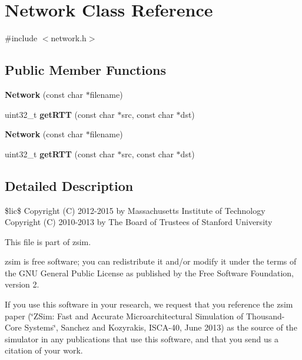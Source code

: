 \hypertarget{classNetwork}{\section{Network Class Reference}
\label{classNetwork}
}


{\ttfamily \#include $<$network.\-h$>$}

\subsection*{Public Member Functions}
\begin{DoxyCompactItemize}
\item 
\hypertarget{classNetwork_abe92fd675aabf57c14612fa7eed101cc}{{\bfseries Network} (const char $\ast$filename)}\label{classNetwork_abe92fd675aabf57c14612fa7eed101cc}

\item 
\hypertarget{classNetwork_ac23b99975b48e83f048c01f5ca90f763}{uint32\-\_\-t {\bfseries get\-R\-T\-T} (const char $\ast$src, const char $\ast$dst)}\label{classNetwork_ac23b99975b48e83f048c01f5ca90f763}

\item 
\hypertarget{classNetwork_abe92fd675aabf57c14612fa7eed101cc}{{\bfseries Network} (const char $\ast$filename)}\label{classNetwork_abe92fd675aabf57c14612fa7eed101cc}

\item 
\hypertarget{classNetwork_ac23b99975b48e83f048c01f5ca90f763}{uint32\-\_\-t {\bfseries get\-R\-T\-T} (const char $\ast$src, const char $\ast$dst)}\label{classNetwork_ac23b99975b48e83f048c01f5ca90f763}

\end{DoxyCompactItemize}


\subsection{Detailed Description}
\$lic\$ Copyright (C) 2012-\/2015 by Massachusetts Institute of Technology Copyright (C) 2010-\/2013 by The Board of Trustees of Stanford University

This file is part of zsim.

zsim is free software; you can redistribute it and/or modify it under the terms of the G\-N\-U General Public License as published by the Free Software Foundation, version 2.

If you use this software in your research, we request that you reference the zsim paper (\char`\"{}\-Z\-Sim\-: Fast and Accurate Microarchitectural Simulation of
\-Thousand-\/\-Core Systems\char`\"{}, Sanchez and Kozyrakis, I\-S\-C\-A-\/40, June 2013) as the source of the simulator in any publications that use this software, and that you send us a citation of your work.

